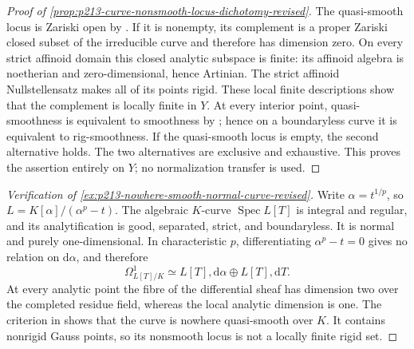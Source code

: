 \begin{proof}[Proof of
\cref{prop:p213-curve-nonsmooth-locus-dichotomy-revised}]
The quasi-smooth locus is Zariski open by
\cite[\S3.1.11]{Ducros24CurveStructure}.  If it is nonempty, its
complement is a proper Zariski closed subset of the irreducible curve and
therefore has dimension zero.  On every strict affinoid domain this closed
analytic subspace is finite: its affinoid algebra is noetherian and
zero-dimensional, hence Artinian.  The strict affinoid Nullstellensatz
\cite[Theorem~4.5]{Tate71Rigid} makes all of its points rigid.  These local
finite descriptions show that the complement is locally finite in $Y$.
At every interior point, quasi-smoothness is equivalent to smoothness by
\cite[\S3.1.11.4]{Ducros24CurveStructure}; hence on a boundaryless curve
it is equivalent to rig-smoothness.  If the quasi-smooth locus is empty,
the second alternative holds.  The two alternatives are exclusive and
exhaustive.  This proves the assertion entirely on $Y$; no normalization
transfer is used.
\end{proof}

\begin{proof}[Verification of
\cref{ex:p213-nowhere-smooth-normal-curve-revised}]
Write $\alpha=t^{1/p}$, so
$L=K[\alpha]/(\alpha^p-t)$.  The algebraic $K$-curve
$\operatorname{Spec}L[T]$ is integral and regular, and its analytification
is good, separated, strict, and boundaryless.  It is normal and purely
one-dimensional.  In characteristic $p$, differentiating
$\alpha^p-t=0$ gives no relation on $\mathrm d\alpha$, and therefore
\begin{equation}
 \Omega^1_{L[T]/K}
      \simeq L[T],\mathrm d\alpha
           \oplus L[T],\mathrm dT.
\label{eq:p213-nowhere-smooth-differentials-revised}
\end{equation}
At every analytic point the fibre of the differential sheaf has dimension
two over the completed residue field, whereas the local analytic dimension
is one.  The criterion in \cite[\S3.1.11]{Ducros24CurveStructure} shows
that the curve is nowhere quasi-smooth over $K$.  It contains nonrigid
Gauss points, so its nonsmooth locus is not a locally finite rigid set.
\end{proof}
